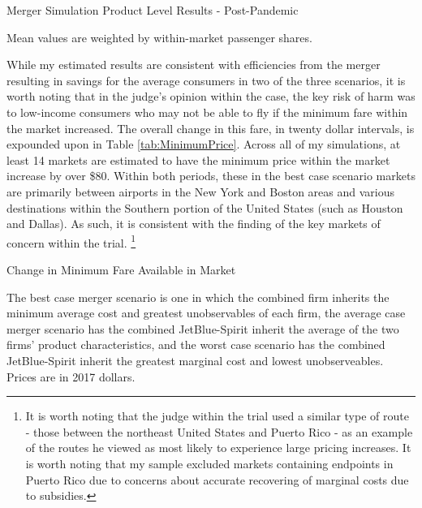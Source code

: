 \documentclass{article}
\begin{document}
    \begin{table}
        \caption{Merger Simulation Product Level Results - Post-Pandemic}
        \label{tab:Simulation_Post}
                \vspace{-15mm}
        \begin{center}
         
         \footnotesize{Mean values are weighted by within-market passenger shares.}
        \end{center}
     \end{table}

    While my estimated results are consistent with efficiencies from the merger resulting in savings for the average consumers in two of the three scenarios, it is worth noting that in the judge's opinion within the case, the key risk of harm was to low-income consumers who may not be able to fly if the minimum fare within the market increased. The overall change in this fare, in twenty dollar intervals, is expounded upon in Table \ref{tab:MinimumPrice}. Across all of my simulations, at least 14 markets are estimated to have the minimum price within the market increase by over \$80. Within both periods, these in the best case scenario markets are primarily between airports in the New York and Boston areas and various destinations within the Southern portion of the United States (such as Houston and Dallas). As such, it is consistent with the finding of the key markets of concern within the trial. \footnote{It is worth noting that the judge within the trial used a similar type of route - those between the northeast United States and Puerto Rico - as an example of the routes he viewed as most likely to experience large pricing increases. It is worth noting that my sample excluded markets containing endpoints in Puerto Rico due to concerns about accurate recovering of marginal costs due to subsidies.} 

    \begin{table}
        \caption{Change in Minimum Fare Available in Market}
        \label{tab:MinimumPrice}
                \vspace{-15mm}
        \begin{center}
            
        \end{center}
        \footnotesize{The best case merger scenario is one in which the combined firm inherits the minimum average cost and greatest unobservables of each firm, the average case merger scenario has the combined JetBlue-Spirit inherit the average of the two firms' product characteristics, and the worst case scenario has the combined JetBlue-Spirit inherit the greatest marginal cost and lowest unobserveables. Prices are in 2017 dollars. }
    \end{table}    
\end{document}
